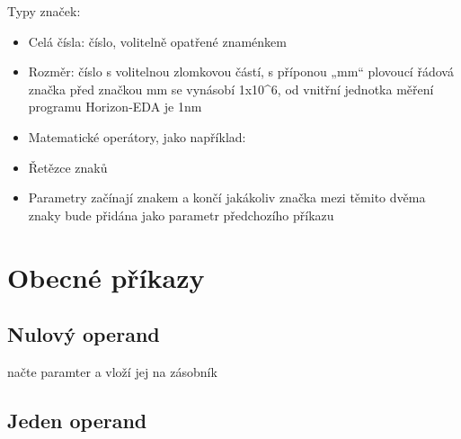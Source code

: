 \documentclass[letterpaper,10pt,czech]{sphinxmanual}
\begin{document}
Typy značek:
\begin{itemize}
\item {} 
Celá čísla: číslo, volitelně opatřené znaménkem

\item {} 
Rozměr: číslo s volitelnou zlomkovou částí, s příponou „mm“ plovoucí řádová značka před značkou mm se vynásobí 1x10\textasciicircum{}6, od vnitřní jednotka měření programu Horizon-EDA je 1nm

\item {} 
Matematické operátory, jako například: \sphinxcode{\sphinxupquote{+ - * /}}

\item {} 
Řetězce znaků

\item {} 
Parametry začínají znakem \sphinxcode{\sphinxupquote{{[}}} a končí \sphinxcode{\sphinxupquote{{]}}} jakákoliv značka mezi těmito dvěma znaky bude přidána jako parametr předchozího příkazu

\end{itemize}


\section{Obecné příkazy}
\label{\detokenize{parameter-programs:obecne-prikazy}}

\subsection{Nulový operand}
\label{\detokenize{parameter-programs:nulovy-operand}}
 načte paramter a vloží jej na zásobník


\subsection{Jeden operand}
\label{\detokenize{parameter-programs:jeden-operand}}
\begin{sphinxVerbatim}[commandchars=\\\{\}]
    

   
   
  

    
          
         
\end{sphinxVerbatim}
\end{document}
